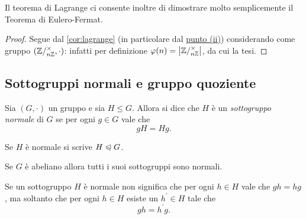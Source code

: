 Il teorema di Lagrange ci consente inoltre di dimostrare molto semplicemente il Teorema di Eulero-Fermat.
\begin{proof}
    Segue dal \autoref{cor:lagrange} (in particolare dal \hyperref[cor:x_alla_ordG=e_G]{punto (ii)}) considerando come gruppo $(\invertible{\Zmod{n}}, \cdot)$: infatti per definizione $\phi(n) = \abs*{\invertible{\Zmod{n}}}$, da cui la tesi.
\end{proof}

\subsection{Sottogruppi normali e gruppo quoziente}

\begin{definition}
     \label{def:sgr_normale}
    Sia $(G, \cdot)$ un gruppo e sia $H \leq G$. Allora si dice che $H$ è un \emph{sottogruppo normale} di $G$ se per ogni $g \in G$ vale che \begin{equation} \label{eq:def_normale}
        gH = Hg.
    \end{equation} 
    
    Se $H$ è normale si scrive $H \normal G$.
\end{definition}

\begin{remark}
    Se $G$ è abeliano allora tutti i suoi sottogruppi sono normali.
\end{remark}
\begin{remark}
    Se un sottogruppo $H$ è normale non significa che per ogni $h \in H$ vale che $gh = hg$, ma soltanto che per ogni $h \in H$ esiste un $h^\prime \in H$ tale che \[
        gh = h^\prime g.    
    \]
\end{remark}

